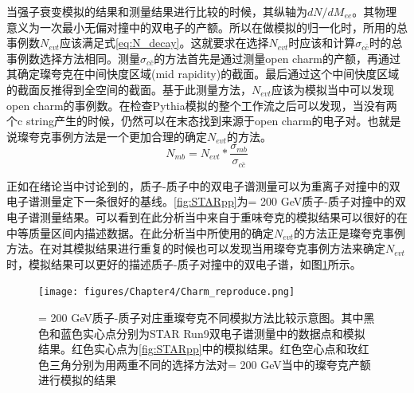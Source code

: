 当强子衰变模拟的结果和测量结果进行比较的时候，其纵轴为$dN/dM_{ee}$。其物理意义为一次最小无偏对撞中的双电子的产额。所以在做模拟的归一化时，所用的总事例数$N_{evt}$应该满足式\ref{eq:N_decay}。这就要求在选择$N_{evt}$时应该和计算$\sigma_{c\bar{c}}$时的总事例数选择方法相同。测量$\sigma_{c\bar{c}}$\cite{STAR:2012nbd}的方法首先是通过测量open charm的产额，再通过其确定璨夸克在中间快度区域(mid rapidity)的截面。最后通过这个中间快度区域的截面反推得到全空间的截面。基于此测量方法，$N_{evt}$应该为模拟当中可以发现open charm的事例数。在检查Pythia模拟的整个工作流之后可以发现，当没有两个c string产生的时候，仍然可以在末态找到来源于open charm的电子对。也就是说璨夸克事例方法是一个更加合理的确定$N_{evt}$的方法。
\begin{equation}
    \label{eq:N_decay}
    N_{mb} = N_{evt}*\frac{\sigma_{mb}}{\sigma_{c\bar{c}}}
\end{equation}

正如在绪论当中讨论到的，质子-质子中的双电子谱测量可以为重离子对撞中的双电子谱测量定下一条很好的基线。\ref{fig:STARpp}为\sNN = 200 GeV质子-质子对撞中的双电子谱测量结果\cite{Guo:2014rba}。可以看到在此分析当中来自于重味夸克的模拟结果可以很好的在中等质量区间内描述数据。在此分析当中所使用的确定$N_{evt}$的方法正是璨夸克事例方法。在对其模拟结果进行重复的时候也可以发现当用璨夸克事例方法来确定$N_{evt}$时，模拟结果可以更好的描述质子-质子对撞中的双电子谱，如图\ref{fig:Charm_reproduce}所示。

\begin{figure}[htb]
    \begin{center}
    \texttt{[image: figures/Chapter4/Charm\_reproduce.png]}
    \end{center}
    \caption[\sNN = 200 GeV质子-质子双电子谱测量结果与璨夸克不同模拟方法比较示意图]{\sNN = 200 GeV质子-质子对庄重璨夸克不同模拟方法比较示意图。其中黑色和蓝色实心点分别为STAR Run9双电子谱测量中的数据点和模拟结果\cite{STAR:2012dzw}。红色实心点为\ref{fig:STARpp}中的模拟结果。红色空心点和玫红色三角分别为用两重不同的选择方法对\sNN = 200 GeV当中的璨夸克产额进行模拟的结果}
    \label{fig:Charm_reproduce}
\end{figure}

